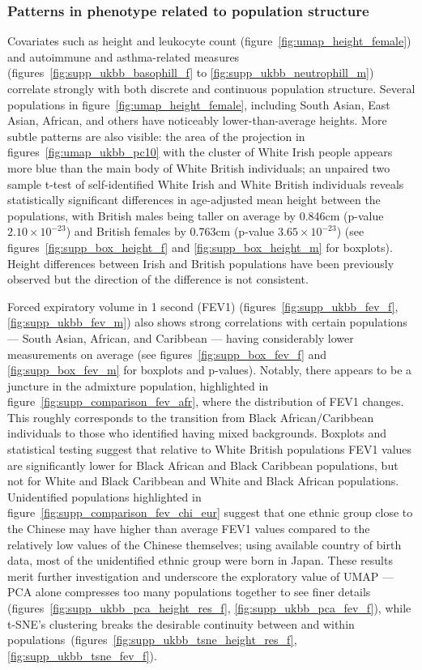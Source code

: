 \documentclass[12pt]{pnas-new}
\begin{document}
\subsubsection*{Patterns in phenotype related to population structure} 
Covariates such as height and leukocyte count (figure~\ref{fig:umap_height_female}) and autoimmune and asthma-related measures  (figures~\ref{fig:supp_ukbb_basophill_f} to \ref{fig:supp_ukbb_neutrophill_m}) correlate strongly with both discrete and continuous population structure. Several populations in figure~\ref{fig:umap_height_female}, including South Asian, East Asian, African, and others have noticeably lower-than-average heights. More subtle patterns are also visible: the area of the projection in figures~\ref{fig:umap_ukbb_pc10} with the cluster of White Irish people appears more blue than the main body of White British individuals; an unpaired two sample t-test of self-identified White Irish and White British individuals reveals statistically significant differences in age-adjusted mean height between the populations, with British males being taller on average by 0.846cm (p-value $2.10\times 10^{-23}$) and British females by 0.763cm (p-value $3.65\times 10^{-23}$) (see figures~\ref{fig:supp_box_height_f} and \ref{fig:supp_box_height_m} for boxplots). Height differences between Irish and British populations have been previously observed but the direction of the difference is not consistent\cite{robinson2015population,komlos1994stature}.

Forced expiratory volume in 1 second (FEV1) (figures~\ref{fig:supp_ukbb_fev_f}, \ref{fig:supp_ukbb_fev_m}) also shows strong correlations with certain populations --- South Asian, African, and Caribbean --- having considerably lower measurements on average (see figures~\ref{fig:supp_box_fev_f} and \ref{fig:supp_box_fev_m} for boxplots and p-values). Notably, there appears to be a juncture in the admixture population, highlighted in figure~\ref{fig:supp_comparison_fev_afr}, where the distribution of FEV1 changes. This roughly corresponds to the transition from Black African/Caribbean individuals to those who identified having mixed backgrounds. Boxplots and statistical testing suggest that relative to White British populations FEV1 values are significantly lower for Black African and Black Caribbean populations, but not for White and Black Caribbean and White and Black African populations. Unidentified populations highlighted in figure~\ref{fig:supp_comparison_fev_chi_eur} suggest that one ethnic group close to the Chinese may have higher than average FEV1 values compared to the relatively low values of the Chinese themselves; using available country of birth data, most of the unidentified ethnic group were born in Japan. These results merit further investigation and underscore the exploratory value of UMAP --- PCA alone compresses too many populations together to see finer details (figures~\ref{fig:supp_ukbb_pca_height_res_f}, \ref{fig:supp_ukbb_pca_fev_f}), while t-SNE's clustering breaks the desirable continuity between and within populations~(figures~\ref{fig:supp_ukbb_tsne_height_res_f}, \ref{fig:supp_ukbb_tsne_fev_f}).
\end{document}
